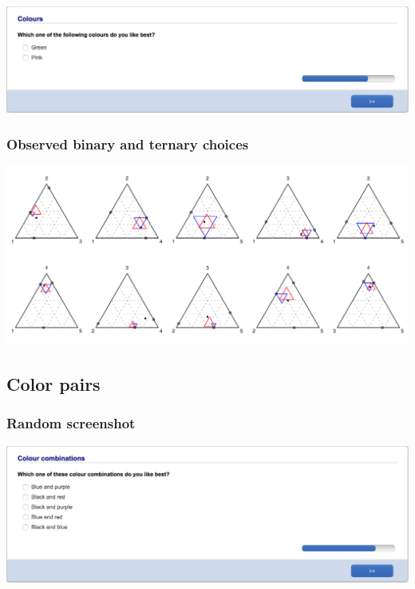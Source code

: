 \documentclass[11pt,letter]{article}
\begin{document}
\includegraphics[width=15cm]{Population_study_design/screenshot_Colours.png}

\subsubsection*{Observed binary and ternary choices}

\includegraphics[width=15cm]{./Population_study_data/Simplexes/Colours.pdf}

\pagebreak

\subsection*{Color pairs}



\subsubsection*{Random screenshot}

\includegraphics[width=15cm]{Population_study_design/screenshot_Colour_Pairs.png}
\end{document}
